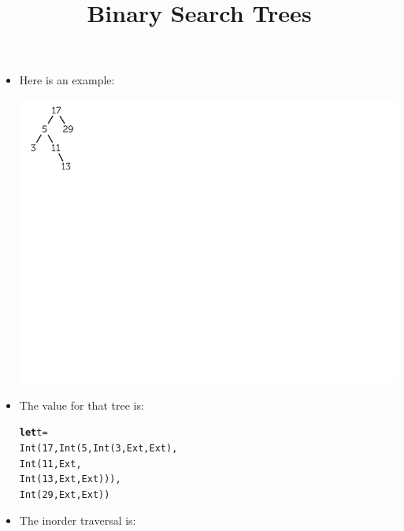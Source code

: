 \documentclass[wide]{slides}
\begin{document}
\begin{slide}
  \title{Binary Search Trees}

  \begin{itemize}

   \item Here is an example:
     \begin{center}
       \includegraphics[trim=5mm 7cm 9cm 2mm]{bst_ex.pdf}
     \end{center}

   \item The \OCaml value for that tree is:
\begin{alltt}
\textbf{let} t =
  Int (17, Int (5, Int (3, Ext, Ext),
                      Int (11, Ext,
                                 Int (13, Ext, Ext))),
             Int (29, Ext, Ext))
\end{alltt}

   \item The inorder traversal is:

      \noindent{}

      \noindent{}

  \end{itemize}
\end{slide}
\end{document}
